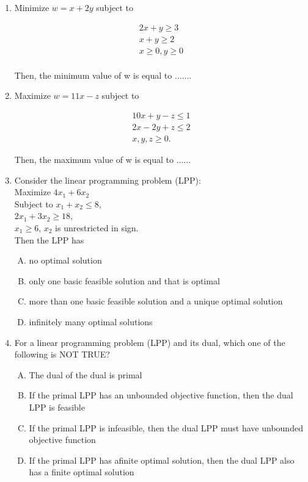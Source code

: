 \documentclass[journal,12pt,twocolumn]{IEEEtran}
\begin{document}
\begin{enumerate}
\item Minimize $w \! = \! x \! + \! 2y$ subject to \\
\begin{center}
\begin{align*}
2x \! + \! y \! \geqslant \! 3 \\
x \! + \! y \! \geqslant \! 2 \\
x \! \geqslant \! 0, \! y \! \geqslant \! 0 \\
\end{align*}
\end{center}
\smallskip
Then, the minimum value of w is equal to .......

\item Maximize $w \! = \! 11x \! - \! z$ subject to \\
\begin{center}
\begin{align*}
10x \! + \! y \! - \! z \! \leqslant \! 1 \\
2x \! - \! 2y \! + \! z \! \leqslant \! 2 \\
x, \! y, \! z \! \geqslant \! 0. 
\end{align*}
\end{center}
\smallskip
Then, the maximum value of w is equal to ......

\item Consider the linear programming problem (LPP): \\
Maximize $4x_1 \! + \! 6x_2$ \\
Subject to $x_1 \! + \! x_2 \! \leqslant \! 8$, \\
$2x_1 \! + \! 3x_2 \! \geqslant \! 18$, \\
$x_1 \! \geqslant \! 6$, $x_2$ is unrestricted in sign.\\
\smallskip
Then the LPP has \\
\begin{enumerate}[(A)]
\setlength\itemsep{1em}
\item no optimal solution
\item only one basic feasible solution and that is optimal
\item more than one basic feasible solution and a unique optimal solution
\item infinitely many optimal solutions
\end{enumerate}

\item For a linear programming problem (LPP) and its dual, which one of the following is NOT TRUE?
\begin{enumerate}[(A)]
\setlength\itemsep{1em}
\item The dual of the dual is primal
\item If the primal LPP has an unbounded objective function, then the dual LPP is feasible
\item If the primal LPP is infeasible, then the dual LPP must have unbounded objective function
\item If the primal LPP has afinite optimal solution, then the dual LPP also has a finite optimal solution
\end{enumerate}


\end{enumerate}
\end{document}
